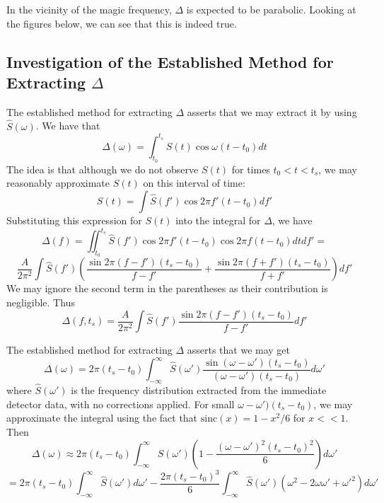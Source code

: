 In the vicinity of the magic frequency, $\Delta$ is expected to be parabolic. Looking at the figures below, we can see that this is indeed true.

\subsection{Investigation of the Established Method for Extracting $\Delta$}

The established method for extracting $\Delta$ asserts that we may extract it by using $\hat{S}(\omega)$. We have that  \[\Delta(\omega)=\int^{t_s}_{t_0}S(t)\cos\omega(t-t_0)dt\] The idea is that although we do not observe $S(t)$ for times $t_0<t<t_s$, we may reasonably approximate $S(t)$ on this interval of time:\[S(t)=\int \hat{S}(f')\cos2\pi f'(t-t_0)df'\] Substituting this expression for $S(t)$ into the integral for $\Delta$, we have \[\Delta(f)=\iint^{t_s}_{t_0}\hat{S}(f')\cos2\pi f'(t-t_0)\cos2\pi f(t-t_0)dtdf'=\]\[\frac{A}{2\pi^2}\int \hat{S}(f')\left(\frac{\sin2\pi(f-f')(t_s-t_0)}{f-f'}+\frac{\sin2\pi(f+f')(t_s-t_0)}{f+f'}\right)df'\] We may ignore the second term in the parentheses as their contribution is negligible. Thus \[\Delta(f,t_s)=\frac{A}{2\pi^2}\int \hat{S}(f')\frac{\sin2\pi(f-f')(t_s-t_0)}{f-f'}df'\]


The established method for extracting $\Delta$ asserts that we may get \[\Delta(\omega)=2\pi(t_s-t_0)\int^{\infty}_{-\infty}\hat{S}(\omega')\frac{\sin(\omega-\omega')(t_s-t_0)}{(\omega-\omega')(t_s-t_0)}d\omega'\] where $\hat{S}(\omega')$ is the frequency distribution extracted from the immediate detector data, with no corrections applied. For small $\omega-\omega')(t_s-t_0)$, we may approximate the integral using the fact that $\text{sinc}(x)=1-x^2/6$ for $x<<1$. Then \[\Delta(\omega)\approx2\pi(t_s-t_0)\int^{\infty}_{-\infty}\hat{S}(\omega')\left(1-\frac{(\omega-\omega')^2(t_s-t_0)^2}{6}\right)d\omega'\]\[=2\pi(t_s-t_0)\int^{\infty}_{-\infty}\hat{S}(\omega')d\omega'-\frac{2\pi(t_s-t_0)^3}{6}\int^{\infty}_{-\infty}\hat{S}(\omega')(\omega^2-2\omega\omega'+\omega'^2)d\omega'\]
